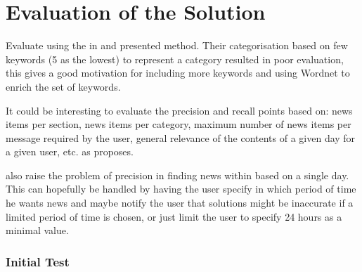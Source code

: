 \chapter{Evaluation of the Solution} %
\label{ch:evaluation}

Evaluate using the in \cite{Sections-categories-and-keywords-as-interest-specification-tools-for-personalised-news-services.pdf} and \cite{Evaluating-a-User-Model-Based-Personalisation-Architecture-for-Digital-News-Services.pdf} presented method. Their categorisation based on few keywords (5 as the lowest) to represent a category resulted in poor evaluation, this gives a good motivation for including more keywords and using Wordnet to enrich the set of keywords.

It could be interesting to evaluate the precision and recall points based on: news items per section, news items per category, maximum number of news items per message required by the user, general relevance of the contents of a given day for a given user, etc. as \cite{Sections-categories-and-keywords-as-interest-specification-tools-for-personalised-news-services.pdf} proposes.

\cite{Sections-categories-and-keywords-as-interest-specification-tools-for-personalised-news-services.pdf} also raise the problem of precision in finding news within based on a single day. This can hopefully be handled by having the user specify in which period of time he wants news and maybe notify the user that solutions might be inaccurate if a limited period of time is chosen, or just limit the user to specify 24 hours as a minimal value.


\subsection{Initial Test}

